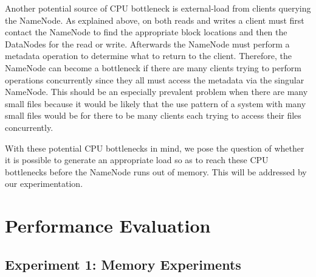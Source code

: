 \documentclass[11pt, a4paper]{article}
\begin{document}
\begin{multicols*}{2}


Another potential source of CPU bottleneck is external-load from clients querying the NameNode. As explained above, on both reads and writes a client must first contact the NameNode to find the appropriate block locations and then the DataNodes for the read or write. Afterwards the NameNode must perform a metadata operation to determine what to return to the client. Therefore, the NameNode can become a bottleneck if there are many clients trying to perform operations concurrently since they all must access the metadata via the singular NameNode. This should be an especially prevalent problem when there are many small files because it would be likely that the use pattern of a system with many small files would be for there to be many clients each trying to access their files concurrently. 

With these potential CPU bottlenecks in mind, we pose the question of whether it is possible to generate an appropriate load so as to reach these CPU bottlenecks before the NameNode runs out of memory. This will be addressed by our experimentation. 

\section{Performance Evaluation}




\subsection{Experiment 1: Memory Experiments}


\end{multicols*}
\end{document}
